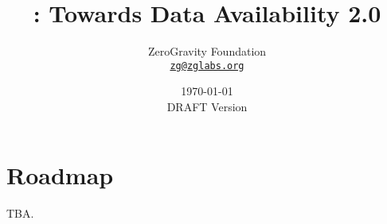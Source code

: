 \documentclass[letterpaper,11pt]{article}
\title{\LARGE \project:
	\Large Towards Data Availability 2.0}
\author{
		ZeroGravity Foundation\\
		\small\href{mailto:zg@zglabs.org}
			{\nolinkurl{zg@zglabs.org}}
	}
\date{\today\\\small DRAFT Version}
\begin{document}
\maketitle
\flushbottom %




\setcounter{tocdepth}{3}

\tableofcontents %

\thispagestyle{empty} %


\newpage













\section{Roadmap}

TBA.



\end{document}

